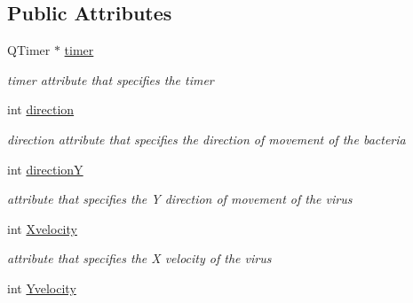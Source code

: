 \subsection*{Public Attributes}
\begin{DoxyCompactItemize}
\item 
\hypertarget{classbacteria_a217dff93e774f9a55370636c5e0d1bef}{Q\-Timer $\ast$ \hyperlink{classbacteria_a217dff93e774f9a55370636c5e0d1bef}{timer}}\label{classbacteria_a217dff93e774f9a55370636c5e0d1bef}

\begin{DoxyCompactList}\small\item\em timer attribute that specifies the timer \end{DoxyCompactList}\item 
\hypertarget{classbacteria_ae0262e42fe93ae2fcd6cb77f53be8d05}{int \hyperlink{classbacteria_ae0262e42fe93ae2fcd6cb77f53be8d05}{direction}}\label{classbacteria_ae0262e42fe93ae2fcd6cb77f53be8d05}

\begin{DoxyCompactList}\small\item\em direction attribute that specifies the direction of movement of the bacteria \end{DoxyCompactList}\item 
\hypertarget{classbacteria_ab4cdc40bc26aa012391f7543f7e0d54b}{int \hyperlink{classbacteria_ab4cdc40bc26aa012391f7543f7e0d54b}{direction\-Y}}\label{classbacteria_ab4cdc40bc26aa012391f7543f7e0d54b}

\begin{DoxyCompactList}\small\item\em attribute that specifies the Y direction of movement of the virus \end{DoxyCompactList}\item 
\hypertarget{classbacteria_a4b0a914494a4d5c26b12181f7546d3e1}{int \hyperlink{classbacteria_a4b0a914494a4d5c26b12181f7546d3e1}{Xvelocity}}\label{classbacteria_a4b0a914494a4d5c26b12181f7546d3e1}

\begin{DoxyCompactList}\small\item\em attribute that specifies the X velocity of the virus \end{DoxyCompactList}\item 
\hypertarget{classbacteria_ab0faabfc046869969c36b88ecd105702}{int \hyperlink{classbacteria_ab0faabfc046869969c36b88ecd105702}{Yvelocity}}\label{classbacteria_ab0faabfc046869969c36b88ecd105702}


\end{DoxyCompactItemize}
